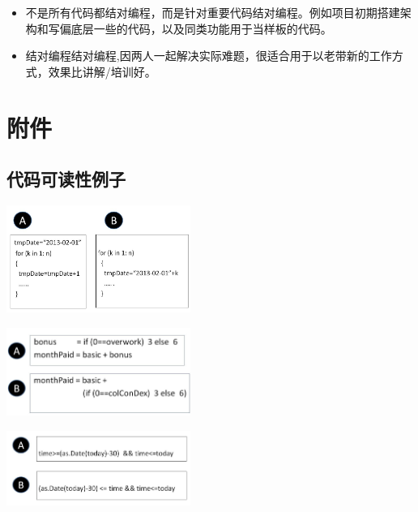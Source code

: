 \begin{itemize}
\tightlist
\item
  不是所有代码都结对编程，而是针对重要代码结对编程。例如项目初期搭建架构和写偏底层一些的代码，以及同类功能用于当样板的代码。
\item
  结对编程结对编程,因两人一起解决实际难题，很适合用于以老带新的工作方式，效果比讲解/培训好。
\end{itemize}

\hypertarget{ux9644ux4ef6}{%
\section{附件}\label{ux9644ux4ef6}}

\hypertarget{ux4ee3ux7801ux53efux8bfbux6027ux4f8bux5b50}{%
\subsection{代码可读性例子}\label{ux4ee3ux7801ux53efux8bfbux6027ux4f8bux5b50}}




\includegraphics[width=6cm]{leip17.jpg}

\includegraphics[width=6cm]{leip18.jpg}

\includegraphics[width=6cm]{leip19.jpg}




